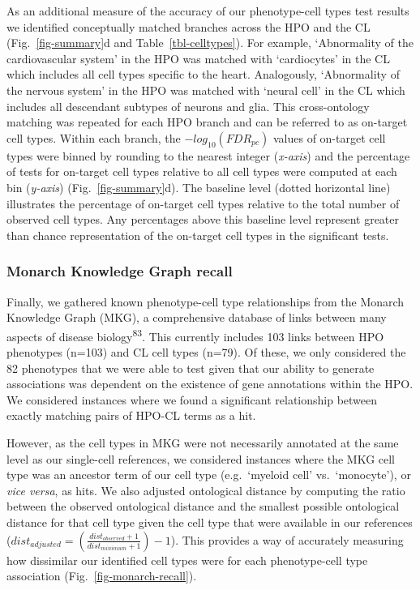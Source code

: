 \documentclass[
]{agujournal2019}
\begin{document}
As an additional measure of the accuracy of our phenotype-cell types
test results we identified conceptually matched branches across the HPO
and the CL (Fig.~\ref{fig-summary}d and Table~\ref{tbl-celltypes}). For
example, `Abnormality of the cardiovascular system' in the HPO was
matched with `cardiocytes' in the CL which includes all cell types
specific to the heart. Analogously, `Abnormality of the nervous system'
in the HPO was matched with `neural cell' in the CL which includes all
descendant subtypes of neurons and glia. This cross-ontology matching
was repeated for each HPO branch and can be referred to as on-target
cell types. Within each branch, the \(-log_{10}(FDR _{pc})\) values of
on-target cell types were binned by rounding to the nearest integer
(\emph{x-axis}) and the percentage of tests for on-target cell types
relative to all cell types were computed at each bin (\emph{y-axis})
(Fig.~\ref{fig-summary}d). The baseline level (dotted horizontal line)
illustrates the percentage of on-target cell types relative to the total
number of observed cell types. Any percentages above this baseline level
represent greater than chance representation of the on-target cell types
in the significant tests.

\subsubsection{Monarch Knowledge Graph
recall}\label{monarch-knowledge-graph-recall-1}

Finally, we gathered known phenotype-cell type relationships from the
Monarch Knowledge Graph (MKG), a comprehensive database of links between
many aspects of disease biology\textsuperscript{83}. This currently
includes 103 links between HPO phenotypes (n=103) and CL cell types
(n=79). Of these, we only considered the 82 phenotypes that we were able
to test given that our ability to generate associations was dependent on
the existence of gene annotations within the HPO. We considered
instances where we found a significant relationship between exactly
matching pairs of HPO-CL terms as a hit.

However, as the cell types in MKG were not necessarily annotated at the
same level as our single-cell references, we considered instances where
the MKG cell type was an ancestor term of our cell type (e.g.~`myeloid
cell' vs.~`monocyte'), or \emph{vice versa}, as hits. We also adjusted
ontological distance by computing the ratio between the observed
ontological distance and the smallest possible ontological distance for
that cell type given the cell type that were available in our references
(\(dist_{adjusted}=(\frac{dist_{observed}+1}{dist_{minimum}+1})-1\)).
This provides a way of accurately measuring how dissimilar our
identified cell types were for each phenotype-cell type association
(Fig.~\ref{fig-monarch-recall}).
\end{document}

